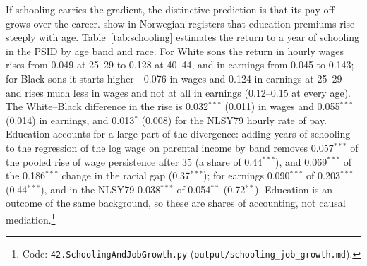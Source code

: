 If schooling carries the gradient, the distinctive prediction is that its pay-off grows over the career.
\citet{bhuller2017life} show in Norwegian registers that education premiums rise steeply with age.
Table~\ref{tab:schooling} estimates the return to a year of schooling in the PSID by age band and race. For White sons the
return in hourly wages rises from 0.049 at 25--29 to 0.128 at 40--44, and in earnings from 0.045 to 0.143; for Black sons
it starts higher---0.076 in wages and 0.124 in earnings at 25--29---and rises much less in wages and not at all in
earnings (0.12--0.15 at every age). The White--Black difference in the rise is 0.032$^{***}$ (0.011) in wages and
0.055$^{***}$ (0.014) in earnings, and 0.013$^{*}$ (0.008) for the NLSY79 hourly rate of pay. Education accounts for a
large part of the divergence: adding years of schooling to the regression of the log wage on parental income by band
removes 0.057$^{***}$ of the pooled rise of wage persistence after 35 (a share of 0.44$^{***}$), and 0.069$^{***}$ of the
0.186$^{***}$ change in the racial gap (0.37$^{***}$); for earnings 0.090$^{***}$ of 0.203$^{***}$ (0.44$^{***}$), and in
the NLSY79 0.038$^{***}$ of 0.054$^{**}$ (0.72$^{**}$). Education is an outcome of the same background, so these are
shares of accounting, not causal mediation.\footnote{Code: \texttt{42.SchoolingAndJobGrowth.py}
(\texttt{output/schooling\_job\_growth.md}).}


